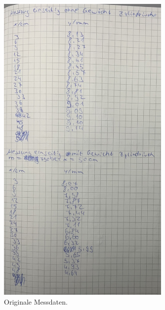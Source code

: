\begin{figure}[H]
    \centering
    \includegraphics[width=0.75\textwidth]{Dateien/Bild4.jpeg}
    \caption{Originale Messdaten.}
    \label{fig:daten4}
\end{figure}